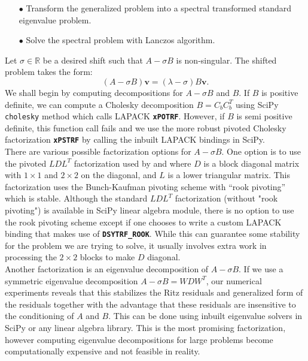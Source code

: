 \begin{itemize}
	\item[$\bullet$] Transform the generalized problem into a spectral transformed standard eigenvalue problem.
	\item[$\bullet$] Solve the spectral problem with Lanczos algorithm.
\end{itemize}
Let $\sigma \in \mathbb{R}$ be a desired shift such that $A - \sigma B$ is non-singular. The shifted problem takes the form:
\begin{equation}\label{eq:ShiftedEigValProblem}
	(A - \sigma B)\mathbf{v} = (\lambda - \sigma)B\mathbf{v}.
\end{equation}
We shall begin by computing decompositions for $A - \sigma B$ and $B$. If $B$ is positive  definite, we can compute a Cholesky decomposition $B = C_bC_b^T$ using SciPy \texttt{cholesky} method which calls LAPACK \textbf{\texttt{xPOTRF}}. However, if $B$ is semi positive definite, this function call fails and we use the more robust pivoted Cholesky factorization \textbf{\texttt{xPSTRF}} by calling the inbuilt LAPACK bindings in SciPy.\\
There are various possible factorization options for $A-\sigma B$. One option is to use the pivoted $LDL^{T}$ factorization used by \cite{stewart2024spectraltransformationdensesymmetric} and \cite{Ericsson1980TheST} where $D$ is a block diagonal matrix with $1 \times 1$ and $2 \times 2$ on the diagonal, and $L$ is a lower triangular matrix. This factorization uses the Bunch-Kaufman pivoting scheme with  ``rook pivoting'' which is stable. Although the standard $LDL^T$ factorization (without "rook pivoting") is available in SciPy linear algebra module, there is no option to use the rook pivoting scheme except if one chooses to write a custom LAPACK binding that makes use of \textbf{\texttt{DSYTRF\_ROOK}}. While this can guarantee some stability for the problem we are trying to solve, it usually involves extra work in processing the $2 \times 2$ blocks to make $D$ diagonal.\\
Another factorization is an eigenvalue decomposition of $A - \sigma B$. If we use a symmetric eigenvalue decomposition $A- \sigma B = WDW^T$, our numerical experiments reveals that this stabilizes the Ritz residuals and generalized form of the residuals together with the advantage that these residuals are insensitive to the conditioning of $A$ and $B$. This can be done using inbuilt eigenvalue solvers in SciPy or any linear algebra library. This is the most promising factorization, however computing eigenvalue decompositions for large problems become computationally expensive and not feasible in reality.

